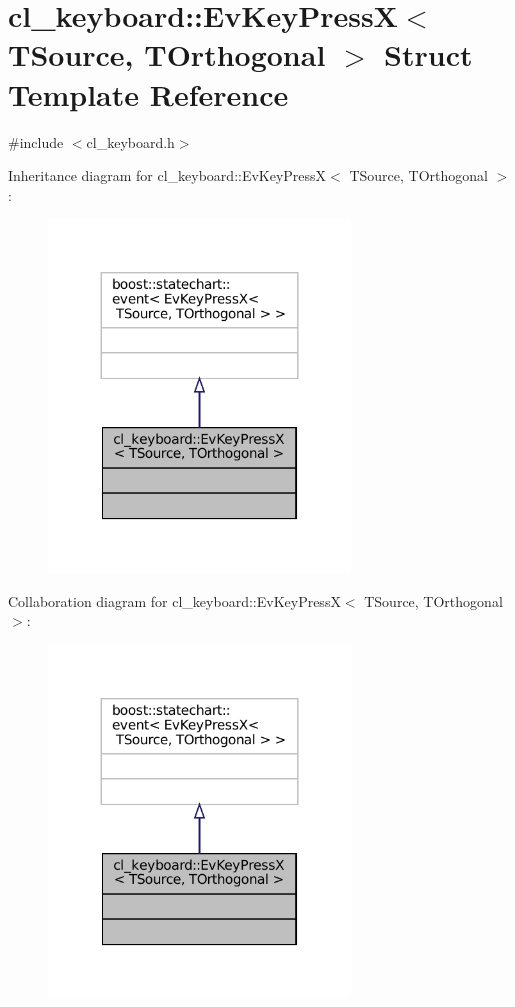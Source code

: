 \hypertarget{structcl__keyboard_1_1EvKeyPressX}{}\section{cl\+\_\+keyboard\+:\+:Ev\+Key\+PressX$<$ T\+Source, T\+Orthogonal $>$ Struct Template Reference}
\label{structcl__keyboard_1_1EvKeyPressX}


{\ttfamily \#include $<$cl\+\_\+keyboard.\+h$>$}



Inheritance diagram for cl\+\_\+keyboard\+:\+:Ev\+Key\+PressX$<$ T\+Source, T\+Orthogonal $>$\+:
\nopagebreak
\begin{figure}[H]
\begin{center}
\leavevmode
\includegraphics[width=227pt]{structcl__keyboard_1_1EvKeyPressX__inherit__graph}
\end{center}
\end{figure}


Collaboration diagram for cl\+\_\+keyboard\+:\+:Ev\+Key\+PressX$<$ T\+Source, T\+Orthogonal $>$\+:
\nopagebreak
\begin{figure}[H]
\begin{center}
\leavevmode
\includegraphics[width=227pt]{structcl__keyboard_1_1EvKeyPressX__coll__graph}
\end{center}
\end{figure}



